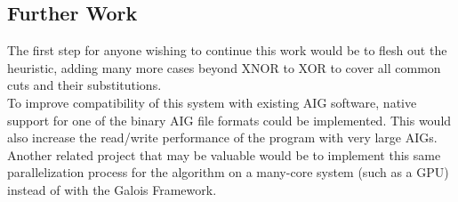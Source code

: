 \documentclass[twocolumn]{article}
\begin{document}
\subsection{Further Work}
The first step for anyone wishing to continue this work would be to flesh out the heuristic, adding many more cases beyond XNOR to XOR to cover all common cuts and their substitutions.\\\indent
To improve compatibility of this system with existing AIG software, native support for one of the binary AIG file formats could be implemented. This would also increase the read/write performance of the program with very large AIGs.\\\indent
Another related project that may be valuable would be to implement this same parallelization process for the algorithm on a many-core system (such as a GPU) instead of with the Galois Framework.


\end{document}
